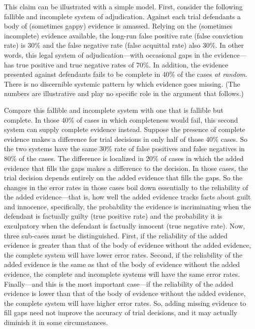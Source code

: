 \documentclass[
  10pt,
  dvipsnames,enabledeprecatedfontcommands]{scrartcl}
\begin{document}
This claim can be illustrated with a simple model. First, consider the
following fallible and incomplete system of adjudication. Against each
trial defendants a body of (sometimes gappy) evidence is amassed.
Relying on the (sometimes incomplete) evidence available, the long-run
false positive rate (false conviction rate) is 30\% and the false
negative rate (false acquittal rate) also 30\%. In other words, this
legal system of adjudication---with occasional gaps in the
evidence---has true positive and true negative rates of 70\%. In
addition, the evidence presented against defendants fails to be complete
in 40\% of the cases \emph{at random}. There is no discernible systemic
pattern by which evidence goes missing. (The numbers are illustrative
and play no specific role in the argument that follows.)

Compare this fallible and incomplete system with one that is fallible
but complete. In those 40\% of cases in which completeness would fail,
this second system can supply complete evidence instead. Suppose the
presence of complete evidence makes a difference for trial decisions in
only half of those 40\% cases. So the two systems have the same 30\%
rate of false positives and false negatives in 80\% of the cases. The
difference is localized in 20\% of cases in which the added evidence
that fills the gaps makes a difference to the decision. In those cases,
the trial decision depends entirely on the added evidence that fills the
gaps. So the changes in the error rates in those cases boil down
essentially to the reliability of the added evidence---that is, how well
the added evidence tracks facts about guilt and innocence, specifically,
the probability the evidence is incriminating when the defendant is
factually guilty (true positive rate) and the probability it is
exculpatory when the defendant is factually innocent (true negative
rate). Now, three sub-cases must be distinguished. First, if the
reliability of the added evidence is greater than that of the body of
evidence without the added evidence, the complete system will have lower
error rates. Second, if the reliability of the added evidence is the
same as that of the body of evidence without the added evidence, the
complete and incomplete systems will have the same error rates.
Finally---and this is the most important case---if the reliability of
the added evidence is lower than that of the body of evidence without
the added evidence, the complete system will have higher error rates.
So, adding missing evidence to fill gaps need not improve the accuracy
of trial decisions, and it may actually diminish it in some
circumstances.
\end{document}
